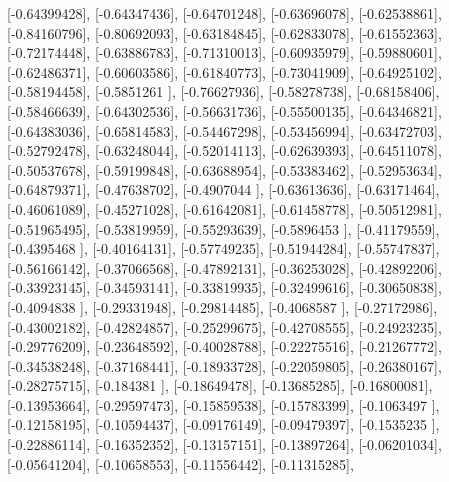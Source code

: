 \documentclass{article}
\begin{document}
       [-0.64399428],
       [-0.64347436],
       [-0.64701248],
       [-0.63696078],
       [-0.62538861],
       [-0.84160796],
       [-0.80692093],
       [-0.63184845],
       [-0.62833078],
       [-0.61552363],
       [-0.72174448],
       [-0.63886783],
       [-0.71310013],
       [-0.60935979],
       [-0.59880601],
       [-0.62486371],
       [-0.60603586],
       [-0.61840773],
       [-0.73041909],
       [-0.64925102],
       [-0.58194458],
       [-0.5851261 ],
       [-0.76627936],
       [-0.58278738],
       [-0.68158406],
       [-0.58466639],
       [-0.64302536],
       [-0.56631736],
       [-0.55500135],
       [-0.64346821],
       [-0.64383036],
       [-0.65814583],
       [-0.54467298],
       [-0.53456994],
       [-0.63472703],
       [-0.52792478],
       [-0.63248044],
       [-0.52014113],
       [-0.62639393],
       [-0.64511078],
       [-0.50537678],
       [-0.59199848],
       [-0.63688954],
       [-0.53383462],
       [-0.52953634],
       [-0.64879371],
       [-0.47638702],
       [-0.4907044 ],
       [-0.63613636],
       [-0.63171464],
       [-0.46061089],
       [-0.45271028],
       [-0.61642081],
       [-0.61458778],
       [-0.50512981],
       [-0.51965495],
       [-0.53819959],
       [-0.55293639],
       [-0.5896453 ],
       [-0.41179559],
       [-0.4395468 ],
       [-0.40164131],
       [-0.57749235],
       [-0.51944284],
       [-0.55747837],
       [-0.56166142],
       [-0.37066568],
       [-0.47892131],
       [-0.36253028],
       [-0.42892206],
       [-0.33923145],
       [-0.34593141],
       [-0.33819935],
       [-0.32499616],
       [-0.30650838],
       [-0.4094838 ],
       [-0.29331948],
       [-0.29814485],
       [-0.4068587 ],
       [-0.27172986],
       [-0.43002182],
       [-0.42824857],
       [-0.25299675],
       [-0.42708555],
       [-0.24923235],
       [-0.29776209],
       [-0.23648592],
       [-0.40028788],
       [-0.22275516],
       [-0.21267772],
       [-0.34538248],
       [-0.37168441],
       [-0.18933728],
       [-0.22059805],
       [-0.26380167],
       [-0.28275715],
       [-0.184381  ],
       [-0.18649478],
       [-0.13685285],
       [-0.16800081],
       [-0.13953664],
       [-0.29597473],
       [-0.15859538],
       [-0.15783399],
       [-0.1063497 ],
       [-0.12158195],
       [-0.10594437],
       [-0.09176149],
       [-0.09479397],
       [-0.1535235 ],
       [-0.22886114],
       [-0.16352352],
       [-0.13157151],
       [-0.13897264],
       [-0.06201034],
       [-0.05641204],
       [-0.10658553],
       [-0.11556442],
       [-0.11315285],
\end{document}

